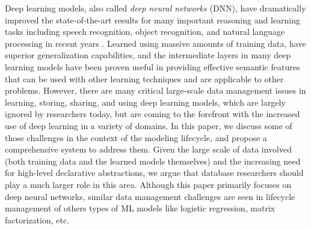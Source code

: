 \documentclass[conference]{IEEEtran}
\begin{document}
Deep learning models, also called {\em deep neural networks} (DNN), have dramatically improved the state-of-the-art results for many important reasoning and learning tasks including speech recognition, object recognition, and natural language processing in recent years \cite{lecun2015nature}. 
Learned using massive amounts of training data, \dnn\models have superior generalization capabilities, and the intermediate layers in many deep learning models have been proven useful in providing effective semantic features that can be used with other learning techniques and are applicable to other problems.
However, there are many critical large-scale data management issues in learning, storing, sharing, and using deep learning models, which are largely ignored by researchers today, but are coming to the forefront with the increased use of deep learning in a variety of domains. 
In this paper, we discuss some of those challenges in the context of the modeling lifecycle, and propose a comprehensive system to address them. Given the large scale of data involved (both training data and the learned models themselves) and the increasing need for high-level declarative abstractions, we argue that database researchers should play a much larger role in this area. Although this paper primarily focuses on deep neural networks, similar data management challenges are seen in lifecycle management of others types of ML models like logistic regression, matrix factorization, etc.


\end{document}
